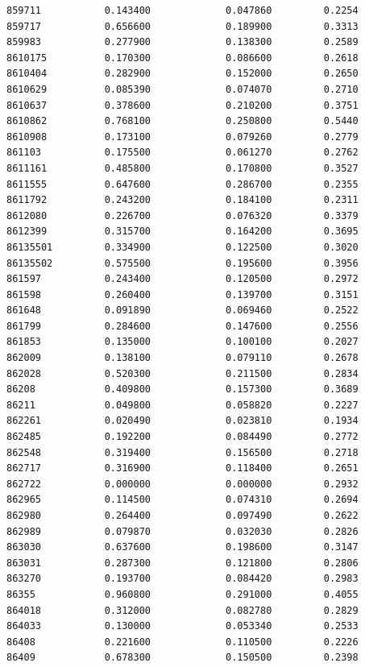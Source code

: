 \documentclass[
  letterpaper,
  DIV=11,
  numbers=noendperiod]{scrartcl}
\begin{document}
\begin{verbatim}
859711           0.143400             0.047860         0.2254
859717           0.656600             0.189900         0.3313
859983           0.277900             0.138300         0.2589
8610175          0.170300             0.086600         0.2618
8610404          0.282900             0.152000         0.2650
8610629          0.085390             0.074070         0.2710
8610637          0.378600             0.210200         0.3751
8610862          0.768100             0.250800         0.5440
8610908          0.173100             0.079260         0.2779
861103           0.175500             0.061270         0.2762
8611161          0.485800             0.170800         0.3527
8611555          0.647600             0.286700         0.2355
8611792          0.243200             0.184100         0.2311
8612080          0.226700             0.076320         0.3379
8612399          0.315700             0.164200         0.3695
86135501         0.334900             0.122500         0.3020
86135502         0.575500             0.195600         0.3956
861597           0.243400             0.120500         0.2972
861598           0.260400             0.139700         0.3151
861648           0.091890             0.069460         0.2522
861799           0.284600             0.147600         0.2556
861853           0.135000             0.100100         0.2027
862009           0.138100             0.079110         0.2678
862028           0.520300             0.211500         0.2834
86208            0.409800             0.157300         0.3689
86211            0.049800             0.058820         0.2227
862261           0.020490             0.023810         0.1934
862485           0.192200             0.084490         0.2772
862548           0.319400             0.156500         0.2718
862717           0.316900             0.118400         0.2651
862722           0.000000             0.000000         0.2932
862965           0.114500             0.074310         0.2694
862980           0.264400             0.097490         0.2622
862989           0.079870             0.032030         0.2826
863030           0.637600             0.198600         0.3147
863031           0.287300             0.121800         0.2806
863270           0.193700             0.084420         0.2983
86355            0.960800             0.291000         0.4055
864018           0.312000             0.082780         0.2829
864033           0.130000             0.053340         0.2533
86408            0.221600             0.110500         0.2226
86409            0.678300             0.150500         0.2398

\end{verbatim}
\end{document}
